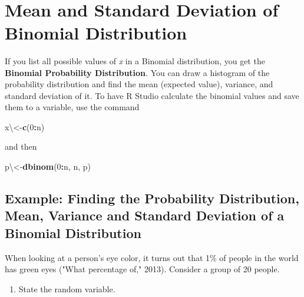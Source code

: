\documentclass[
]{book}
\newenvironment{Shaded}{\begin{snugshade}}{\end{snugshade}}
\newcommand{\DecValTok}[1]{\textcolor[rgb]{0.00,0.00,0.81}{#1}}
\newcommand{\KeywordTok}[1]{\textcolor[rgb]{0.13,0.29,0.53}{\textbf{#1}}}
\newcommand{\NormalTok}[1]{#1}
\newcommand{\OperatorTok}[1]{\textcolor[rgb]{0.81,0.36,0.00}{\textbf{#1}}}
\providecommand{\tightlist}{%
  \setlength{\itemsep}{0pt}\setlength{\parskip}{0pt}}
\begin{document}
\textbf{\\
}

\hypertarget{mean-and-standard-deviation-of-binomial-distribution}{%
\section{Mean and Standard Deviation of Binomial Distribution}\label{mean-and-standard-deviation-of-binomial-distribution}}

If you list all possible values of \emph{x} in a Binomial distribution, you get the \textbf{Binomial Probability Distribution}. You can draw a histogram of the probability distribution and find the mean (expected value), variance, and standard deviation of it. To have R Studio calculate the binomial values and save them to a variable, use the command

\begin{Shaded}
\begin{Highlighting}[]
\NormalTok{x\textbackslash{}<-}\KeywordTok{c}\NormalTok{(}\DecValTok{0}\OperatorTok{:}\NormalTok{n)}
\end{Highlighting}
\end{Shaded}

and then

\begin{Shaded}
\begin{Highlighting}[]
\NormalTok{p\textbackslash{}<-}\KeywordTok{dbinom}\NormalTok{(}\DecValTok{0}\OperatorTok{:}\NormalTok{n, n, p)}
\end{Highlighting}
\end{Shaded}

\hypertarget{example-finding-the-probability-distribution-mean-variance-and-standard-deviation-of-a-binomial-distribution}{%
\subsection{Example: Finding the Probability Distribution, Mean, Variance and Standard Deviation of a Binomial Distribution}\label{example-finding-the-probability-distribution-mean-variance-and-standard-deviation-of-a-binomial-distribution}}

When looking at a person's eye color, it turns out that 1\% of people in the world has green eyes ("What percentage of," 2013). Consider a group of 20 people.

\begin{enumerate}
\def\labelenumi{\alph{enumi}.}
\tightlist
\item
  State the random variable.
\end{enumerate}
\end{document}
